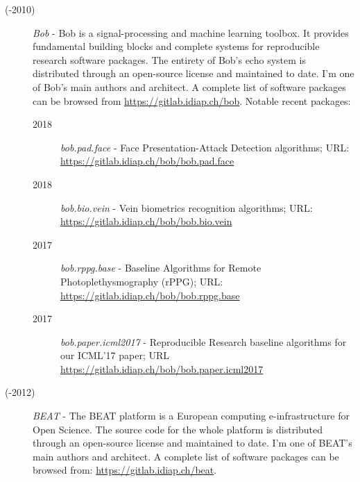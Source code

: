\documentclass[11pt,a4paper,sans]{moderncv}
\begin{document}
\begin{description}

  \item[\the\year(-2010)] \textit{Bob} - Bob is a signal-processing and machine
    learning toolbox.  It provides fundamental building blocks and complete
    systems for reproducible research software packages.  The entirety of Bob's
    echo system is distributed through an open-source license and maintained to
    date. I'm one of Bob's main authors and architect.  A complete list of
    software packages can be browsed from \url{https://gitlab.idiap.ch/bob}.
    Notable recent packages:

    \begin{description}
      \item[2018] \textit{bob.pad.face} - Face Presentation-Attack Detection
        algorithms; URL: \url{https://gitlab.idiap.ch/bob/bob.pad.face}

      \item[2018] \textit{bob.bio.vein} - Vein biometrics recognition
        algorithms; URL: \url{https://gitlab.idiap.ch/bob/bob.bio.vein}

      \item[2017] \textit{bob.rppg.base} - Baseline Algorithms for Remote
        Photoplethysmography (rPPG); URL:
        \url{https://gitlab.idiap.ch/bob/bob.rppg.base}

      \item[2017] \textit{bob.paper.icml2017} - Reproducible Research baseline
        algorithms for our ICML'17 paper; URL
        \url{https://gitlab.idiap.ch/bob/bob.paper.icml2017}
    \end{description}


  \item[\the\year(-2012)] \textit{BEAT} - The BEAT platform is a European
    computing e-infrastructure for Open Science.  The source code for the whole
    platform is distributed through an open-source license and maintained to
    date.  I'm one of BEAT's main authors and architect.  A complete list of
    software packages can be browsed from: \url{https://gitlab.idiap.ch/beat}.

\end{description}
\end{document}
